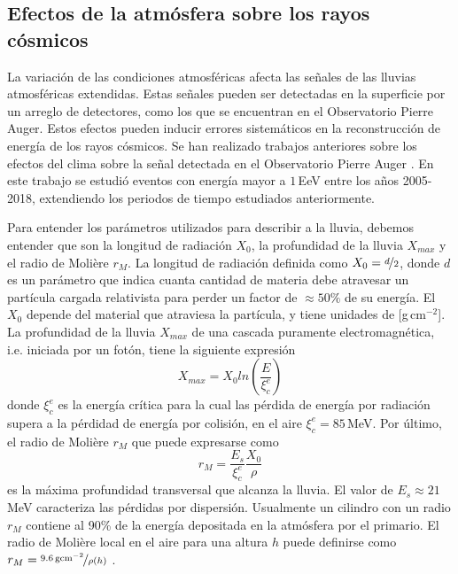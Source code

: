 \subsection{Efectos de la atmósfera sobre los rayos cósmicos}

La variación de las condiciones atmosféricas afecta las señales de las lluvias atmosféricas extendidas. Estas señales pueden ser detectadas en la superficie por un arreglo de detectores, como los que se encuentran en el Observatorio Pierre Auger. Estos efectos pueden inducir errores sistemáticos en la reconstrucción de energía de los rayos cósmicos. Se han realizado  trabajos anteriores sobre los efectos del clima sobre la señal detectada en el Observatorio Pierre Auger \cite{collaboration2009atmospheric} \cite{aab2017impact}. En este trabajo se estudió eventos con energía mayor a $1\,$EeV entre los años 2005-2018, extendiendo los periodos de tiempo estudiados anteriormente.

Para entender los parámetros utilizados para describir a la lluvia, debemos entender que son la longitud de radiación $X_0$, la profundidad de la lluvia $X_{max}$ y el radio de Molière $r_M$. La longitud de radiación definida como $X_0=\nicefrac{d}{2}$,  donde $d$ es un parámetro que indica cuanta cantidad de materia debe atravesar un partícula cargada relativista para perder un factor de $\approx 50\%$ de su  energía. El $X_0$ depende del material que atraviesa la partícula, y tiene unidades de [g\,cm$^{-2}$]. La profundidad de la lluvia $X_{max}$ de una cascada puramente electromagnética, i.e. iniciada por un fotón, tiene la siguiente expresión \cite{matthews2005heitler}
\begin{equation}
 	X_{max} = X_0{ln(\frac{E}{\xi^e_c})}
 \end{equation} 
donde  $\xi^e_c$ es la energía crítica para la cual las pérdida de energía por radiación supera a la pérdidad de energía por colisión, en el aire $\xi^e_c=85\,$MeV. Por último, el radio de Molière $r_M$ que puede expresarse como 
\begin{equation}
	r_M= \frac{E_s}{\xi^e_c}\frac{X_0}{\rho}
\end{equation}
es la máxima profundidad transversal que alcanza la lluvia. El valor de $E_s\approx21\,$MeV caracteriza las pérdidas por dispersión. Usualmente un cilindro con un radio $r_M$ contiene al 90\% de la energía depositada en la atmósfera por el primario. El radio de Molière local en el aire para una altura $h$ puede definirse como $r_M = \nicefrac{9.6\,\text{gcm}^{-2}}{\rho(h)}$ \cite{gora2006universal}. 

